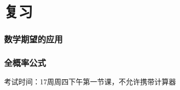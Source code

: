 \section{复习}%
\label{sec:复习}
\subsubsection*{数学期望的应用}%
\label{subsub:数学期望的应用}

\subsubsection*{全概率公式}%
\label{subsub:全概率公式}

考试时间：17周周四下午第一节课，不允许携带计算器
